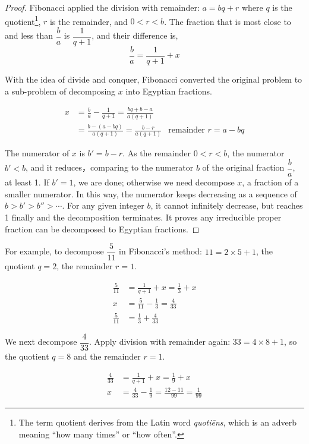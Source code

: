 \documentclass[b5paper]{article}
\begin{document}
\begin{proof}
Fibonacci applied the division with remainder: $a = bq + r$ where $q$ is the quotient\footnote{The term quotient derives from the Latin word \emph{quotiēns}, which is an adverb meaning ``how many times'' or ``how often''.}, $r$ is the remainder, and $0 < r < b$. The fraction that is most close to and less than $\dfrac{b}{a}$ is $\dfrac{1}{q + 1}$, and their difference is,
\[
  \frac{b}{a} = \frac{1}{q + 1} + x
\]

With the idea of divide and conquer, Fibonacci converted the original problem to a sub-problem of decomposing $x$ into Egyptian fractions.

\begin{align*}
  x & = \frac{b}{a} - \frac{1}{q + 1} = \frac{bq + b - a}{a(q + 1)} \\
    & = \frac{b - (a - bq)}{a(q+1)} = \frac{b - r}{a(q+1)} & \text{remainder } r = a - bq
\end{align*}

The numerator of $x$ is $b' = b - r$. As the remainder $0 < r < b$, the numerator $b' < b$, and it reduces，comparing to the numerator $b$ of the original fraction $\dfrac{b}{a}$, at least 1. If $b' = 1$, we are done; otherwise we need decompose $x$, a fraction of a smaller numerator. In this way, the numerator keeps decreasing as a sequence of $b > b' > b'' > \cdots$. For any given integer $b$, it cannot infinitely decrease, but reaches 1 finally and the decomposition terminates. It proves any irreducible proper fraction can be decomposed to Egyptian fractions.
\end{proof}

For example, to decompose $\dfrac{5}{11}$ in Fibonacci's method: $11 = 2 \times 5 + 1$, the quotient $q = 2$, the remainder $r = 1$.

\begin{align*}
\frac{5}{11} & = \frac{1}{q + 1} + x = \frac{1}{3} + x  \\
 x &= \frac{5}{11} - \frac{1}{3} = \frac{4}{33} \\
\frac{5}{11} &= \frac{1}{3} + \frac{4}{33}
\end{align*}

We next decompose $\dfrac{4}{33}$. Apply division with remainder again: $33 = 4 \times 8 + 1$, so the quotient $q = 8$ and the remainder $r = 1$.

\begin{align*}
\frac{4}{33} & = \frac{1}{q + 1} + x = \frac{1}{9} + x  \\
 x &= \frac{4}{33} - \frac{1}{9} = \frac{12 - 11}{99} = \frac{1}{99}
\end{align*}
\end{document}
